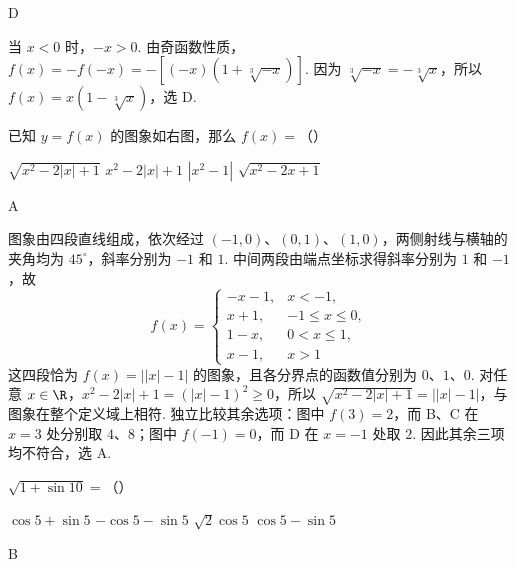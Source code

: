 \documentclass[UTF8,a4paper,oneside,11pt]{ctexbook}
\begin{document}
\begin{answer}
D
\end{answer}

\begin{solution}
当 \(x<0\) 时，\(-x>0\). 由奇函数性质，\(f(x)=-f(-x)=-\left[(-x)\left(1+\sqrt[3]{-x}\right)\right]\). 因为 \(\sqrt[3]{-x}=-\sqrt[3]{x}\)，所以 \(f(x)=x\left(1-\sqrt[3]{x}\right)\)，选 D.
\end{solution}

\begin{problem}
已知 \(y = f(x)\) 的图象如右图，那么 \(f(x)=\)（\quad）


\choices
    {\(\sqrt{x^2 - 2|x| + 1}\)}
    {\(x^2 - 2|x| + 1\)}
    {\(|x^2 - 1|\)}
    {\(\sqrt{x^2 - 2x + 1}\)}
\end{problem}

\begin{answer}
A
\end{answer}

\begin{solution}
图象由四段直线组成，依次经过 \((-1,0)\)、\((0,1)\)、\((1,0)\)，两侧射线与横轴的夹角均为 \(45^\circ\)，斜率分别为 \(-1\) 和 \(1\). 中间两段由端点坐标求得斜率分别为 \(1\) 和 \(-1\)，故
\[
f(x)=\begin{cases}
-x-1, & x<-1,\\
x+1, & -1\le x\le0,\\
1-x, & 0<x\le1,\\
x-1, & x>1
\end{cases}
\]
这四段恰为 \(f(x)=\left||x|-1\right|\) 的图象，且各分界点的函数值分别为 \(0\)、\(1\)、\(0\). 对任意 \(x\in\R\)，\(x^2-2|x|+1=(|x|-1)^2\ge0\)，所以 \(\sqrt{x^2-2|x|+1}=\left||x|-1\right|\)，与图象在整个定义域上相符. 独立比较其余选项：图中 \(f(3)=2\)，而 B、C 在 \(x=3\) 处分别取 \(4\)、\(8\)；图中 \(f(-1)=0\)，而 D 在 \(x=-1\) 处取 \(2\). 因此其余三项均不符合，选 A.
\end{solution}

\begin{problem}
\(\sqrt{1 + \sin 10}=\)（\quad）

\choices
    {\(\cos 5 + \sin 5\)}
    {\(-\cos 5 - \sin 5\)}
    {\(\sqrt{2}\cos 5\)}
    {\(\cos 5 - \sin 5\)}
\end{problem}

\begin{answer}
B
\end{answer}
\end{document}
